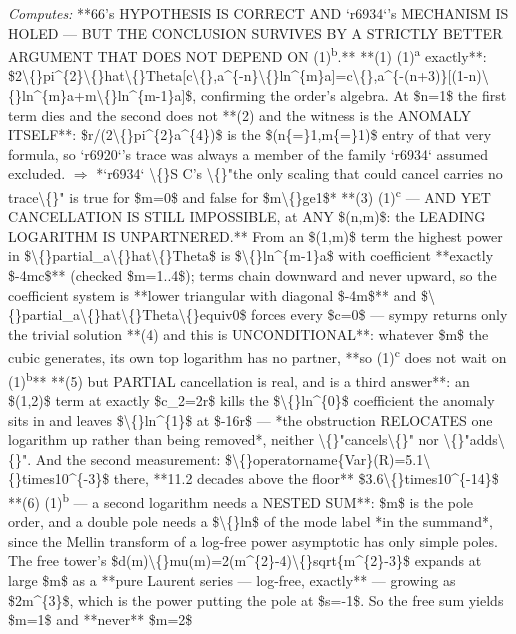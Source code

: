 \begin{description}
\emph{Computes:} **66's HYPOTHESIS IS CORRECT AND `r6934`'s MECHANISM IS HOLED --- BUT THE CONCLUSION SURVIVES BY A STRICTLY BETTER ARGUMENT THAT DOES NOT DEPEND ON (1)\textsuperscript{b}.**  **(1) (1)\textsuperscript{a} exactly**: \$2\textbackslash\{\}pi\textasciicircum{}\{2\}\textbackslash\{\}hat\textbackslash\{\}Theta[c\textbackslash\{\},a\textasciicircum{}\{-n\}\textbackslash\{\}ln\textasciicircum{}\{m\}a]=c\textbackslash\{\},a\textasciicircum{}\{-(n+3)\}[(1-n)\textbackslash\{\}ln\textasciicircum{}\{m\}a+m\textbackslash\{\}ln\textasciicircum{}\{m-1\}a]\$, confirming the order's algebra. At \$n=1\$ the first term dies and the second does not  **(2) and the witness is the ANOMALY ITSELF**: \$r/(2\textbackslash\{\}pi\textasciicircum{}\{2\}a\textasciicircum{}\{4\})\$ is the \$(n\{=\}1,m\{=\}1)\$ entry of that very formula, so `r6920`'s trace was always a member of the family `r6934` assumed excluded. \ensuremath{\Rightarrow} *`r6934` \textbackslash\{\}S C's \textbackslash\{\}"the only scaling that could cancel carries no trace\textbackslash\{\}" is true for \$m=0\$ and false for \$m\textbackslash\{\}ge1\$*  **(3) (1)\textsuperscript{c} --- AND YET CANCELLATION IS STILL IMPOSSIBLE, at ANY \$(n,m)\$: the LEADING LOGARITHM IS UNPARTNERED.** From an \$(1,m)\$ term the highest power in \$\textbackslash\{\}partial\_a\textbackslash\{\}hat\textbackslash\{\}Theta\$ is \$\textbackslash\{\}ln\textasciicircum{}\{m-1\}a\$ with coefficient **exactly \$-4mc\$** (checked \$m=1..4\$); terms chain downward and never upward, so the coefficient system is **lower triangular with diagonal \$-4m\$** and \$\textbackslash\{\}partial\_a\textbackslash\{\}hat\textbackslash\{\}Theta\textbackslash\{\}equiv0\$ forces every \$c=0\$ --- sympy returns only the trivial solution  **(4) and this is UNCONDITIONAL**: whatever \$m\$ the cubic generates, its own top logarithm has no partner, **so (1)\textsuperscript{c} does not wait on (1)\textsuperscript{b}**  **(5) but PARTIAL cancellation is real, and is a third answer**: an \$(1,2)\$ term at exactly \$c\_2=2r\$ kills the \$\textbackslash\{\}ln\textasciicircum{}\{0\}\$ coefficient the anomaly sits in and leaves \$\textbackslash\{\}ln\textasciicircum{}\{1\}\$ at \$-16r\$ --- *the obstruction RELOCATES one logarithm up rather than being removed*, neither \textbackslash\{\}"cancels\textbackslash\{\}" nor \textbackslash\{\}"adds\textbackslash\{\}". And the second measurement: \$\textbackslash\{\}operatorname\{Var\}(R)=5.1\textbackslash\{\}times10\textasciicircum{}\{-3\}\$ there, **11.2 decades above the floor** \$3.6\textbackslash\{\}times10\textasciicircum{}\{-14\}\$  **(6) (1)\textsuperscript{b} --- a second logarithm needs a NESTED SUM**: \$m\$ is the pole order, and a double pole needs a \$\textbackslash\{\}ln\$ of the mode label *in the summand*, since the Mellin transform of a log-free power asymptotic has only simple poles. The free tower's \$d(m)\textbackslash\{\}mu(m)=2(m\textasciicircum{}\{2\}-4)\textbackslash\{\}sqrt\{m\textasciicircum{}\{2\}-3\}\$ expands at large \$m\$ as a **pure Laurent series --- log-free, exactly** --- growing as \$2m\textasciicircum{}\{3\}\$, which is the power putting the pole at \$s=-1\$. So the free sum yields \$m=1\$ and **never** \$m=2\$

\end{description}
